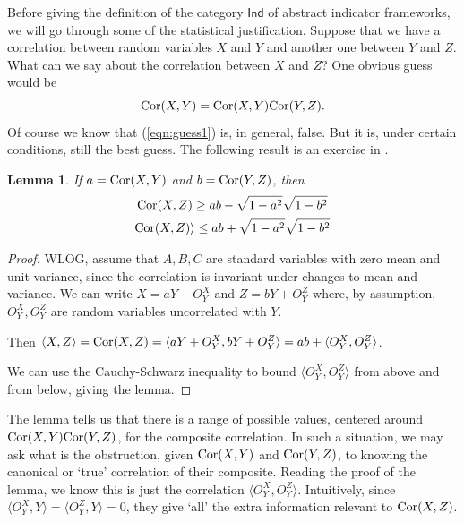 \documentclass{sig-alternate-05-2015}
\theoremstyle{plain}
\newtheorem{lem}[thm]{Lemma}
\theoremstyle{plain}
\theoremstyle{remark}
\newcommand{\Cat}[1]{\mathsf{#1}}
\def\Ind{\Cat{Ind}}
\def\Cor{\textnormal{Cor}}
\begin{document}
Before giving the definition of the category $\Ind$ of abstract indicator frameworks, we will go through some of the statistical justification. Suppose that we have a correlation between random variables $X$ and $Y$ and another one between $Y$ and $Z$. What can we say about the correlation between $X$ and $Z$? One obvious guess would be 
\begin{equation}\label{eqn:guess1}\Cor(X,Y) = \Cor(X,Y)\Cor(Y,Z).\end{equation}
Of course we know that (\ref{eqn:guess1}) is, in general, false. But it is, under certain conditions, still the best guess. The following result is an exercise in \cite{statistics_textbook}.

\begin{lem}If $a = \Cor(X,Y)$ and $b = \Cor(Y,Z)$, then 
\begin{gather}
\Cor(X,Z) \geq ab - \sqrt{1-a^2}\sqrt{1-b^2} \\ 
\Cor(X,Z) \rangle \leq ab + \sqrt{1-a^2}\sqrt{1-b^2}
\end{gather}
\end{lem}

\begin{proof}
WLOG, assume that $A,B,C$ are standard variables with zero mean and unit variance, since the correlation is invariant under changes to mean and variance. We can write $X = a Y + O_Y^X$ and $Z = b Y + O_Y^Z$ where, by assumption, $O_Y^X, O_Y^Z$ are random variables uncorrelated with $Y$.

Then $\langle X, Z \rangle = \Cor(X,Z) = \langle aY + O_Y^X, bY + O_Y^Z \rangle = ab + \langle O_Y^X, O_Y^Z \rangle$.

We can use the Cauchy-Schwarz inequality to bound $\langle O_Y^X, O_Y^Z \rangle$ from above and from below, giving the lemma.
\end{proof}

The lemma tells us that there is a range of possible values, centered around $\Cor(X,Y)\Cor(Y,Z)$, for the composite correlation. %
In such a situation, we may ask what is the obstruction, given $\Cor(X,Y)$ and $\Cor(Y,Z)$, to knowing the canonical or `true' correlation of their composite. Reading the proof of the lemma, we know this is just the correlation $\langle O_Y^X, O_Y^Z \rangle$. Intuitively, since $\langle O_Y^X, Y \rangle = \langle O_Y^Z, Y \rangle = 0$, they give `all' the extra information relevant to $\Cor(X,Z)$. %
\end{document}
